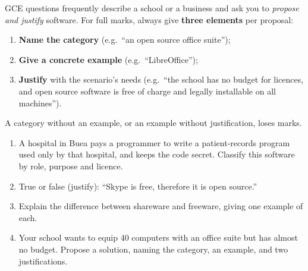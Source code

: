 \documentclass[11pt]{article}
\begin{document}
\begin{methode}
GCE questions frequently describe a school or a business and ask you to \emph{propose and justify} software. For full marks, always give \textbf{three elements} per proposal:
\begin{enumerate}
\item \textbf{Name the category} (e.g.\ ``an open source office suite'');
\item \textbf{Give a concrete example} (e.g.\ ``LibreOffice'');
\item \textbf{Justify} with the scenario's needs (e.g.\ ``the school has no budget for licences, and open source software is free of charge and legally installable on all machines'').
\end{enumerate}
A category without an example, or an example without justification, loses marks.
\end{methode}

\begin{exercice}[Practice]
\begin{enumerate}
\item A hospital in Buea pays a programmer to write a patient-records program used only by that hospital, and keeps the code secret. Classify this software by role, purpose and licence.
\item True or false (justify): ``Skype is free, therefore it is open source.''
\item Explain the difference between shareware and freeware, giving one example of each.
\item Your school wants to equip 40 computers with an office suite but has almost no budget. Propose a solution, naming the category, an example, and two justifications.
\end{enumerate}
\end{exercice}
\end{document}
